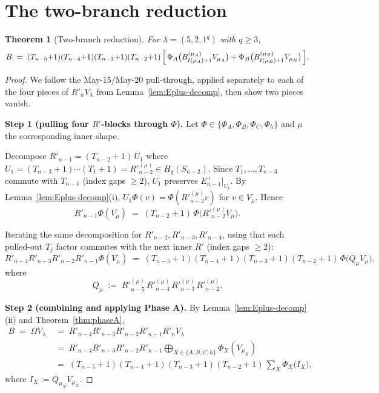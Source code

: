 \documentclass[11pt]{article}
\newtheorem{theorem}{Theorem}
\theoremstyle{definition}
\newcommand{\Hq}{H_q}
\newcommand{\Om}{\Omega}
\newcommand{\Rp}{{R'}}
\begin{document}
\section{The two-branch reduction}\label{sec:reduction}

\begin{theorem}[Two-branch reduction]\label{thm:reduction}
For $\lambda = (5, 2, 1^q)$ with $q \ge 3$,
\begin{equation}\label{eq:reduction}
   B \;=\; (T_{n-5}{+}1)(T_{n-4}{+}1)(T_{n-3}{+}1)(T_{n-2}{+}1)\,
   \Bigl[\,\Phi_A\bigl(B_{\ell(\mu_A)+1}^{(\mu_A)} V_{\mu_A}\bigr)
        + \Phi_B\bigl(B_{\ell(\mu_B)+1}^{(\mu_B)} V_{\mu_B}\bigr)
   \,\Bigr].
\end{equation}
\end{theorem}

\begin{proof}
We follow the May-15/May-20 pull-through, applied separately to each
of the four pieces of $\Rp_n V_\lambda$ from
Lemma~\ref{lem:Eplus-decomp}, then show two pieces vanish.

\medskip\textbf{Step 1 (pulling four $\Rp$-blocks through $\Phi$).}
Let $\Phi \in \{\Phi_A, \Phi_B, \Phi_C, \Phi_h\}$ and $\mu$ the
corresponding inner shape.

Decompose $\Rp_{n-1} = (T_{n-2}+1)\,U_1$ where $U_1 = (T_{n-3}+1)\cdots
(T_1+1) = \Rp_{n-2}^{(\mu)} \in \Hq(S_{n-2})$.  Since $T_1, \ldots,
T_{n-3}$ commute with $T_{n-1}$ (index gaps $\ge 2$), $U_1$ preserves
$E_{n-1}^+|_{V_\lambda}$.  By Lemma~\ref{lem:Eplus-decomp}(i), $U_1
\Phi(v) = \Phi(\Rp_{n-2}^{(\mu)} v)$ for $v \in V_\mu$.  Hence
\[
   \Rp_{n-1}\Phi(V_\mu)
   \;=\; (T_{n-2}+1)\,\Phi\bigl(\Rp_{n-2}^{(\mu)} V_\mu\bigr).
\]

Iterating the same decomposition for $\Rp_{n-2}, \Rp_{n-3}, \Rp_{n-4}$,
using that each pulled-out $T_j$ factor commutes with the next inner
$\Rp$ (index gaps $\ge 2$):
\begin{equation}\label{eq:branchpull}
   \Rp_{n-4}\Rp_{n-3}\Rp_{n-2}\Rp_{n-1}\Phi(V_\mu)
   \;=\; (T_{n-5}+1)(T_{n-4}+1)(T_{n-3}+1)(T_{n-2}+1)\,
   \Phi\bigl(Q_\mu V_\mu\bigr),
\end{equation}
where
\[
   Q_\mu \;:=\; \Rp_{n-5}^{(\mu)}\, \Rp_{n-4}^{(\mu)}\, \Rp_{n-3}^{(\mu)}\, \Rp_{n-2}^{(\mu)}.
\]

\medskip\textbf{Step 2 (combining and applying Phase A).}
By Lemma~\ref{lem:Eplus-decomp}(ii) and Theorem~\ref{thm:phaseA},
\begin{align*}
   B \;=\; \Om V_\lambda
   &\;=\; \Rp_{n-4}\Rp_{n-3}\Rp_{n-2}\Rp_{n-1} \Rp_n V_\lambda \\
   &\;=\; \Rp_{n-4}\Rp_{n-3}\Rp_{n-2}\Rp_{n-1}
      \!\!\!\bigoplus_{X \in \{A,B,C,h\}}\!\!\!\Phi_X(V_{\mu_X}) \\
   &\;=\; (T_{n-5}{+}1)(T_{n-4}{+}1)(T_{n-3}{+}1)(T_{n-2}{+}1)\,
        \sum_{X}\Phi_X\bigl(I_X\bigr),
\end{align*}
where $I_X := Q_{\mu_X} V_{\mu_X}$.


\end{proof}
\end{document}
